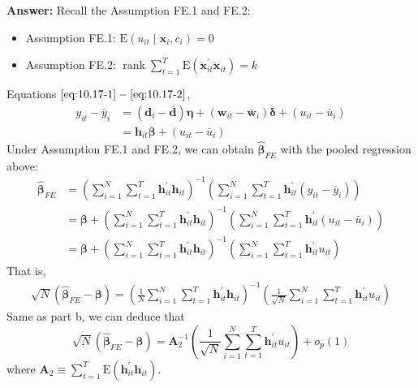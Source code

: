 \begin{enumerate}
\begin{enumerate}
        \textbf{Answer:} Recall the Assumption FE.1 and FE.2:
        \begin{itemize}
            \item Assumption FE.1: $\mathrm{E}(u_{it} \mid \mathbf{x}_i,c_i) = 0$
            \item Assumption FE.2: $\operatorname{rank} \sum_{t=1}^T \mathrm{E} \left( \ddot{\mathbf{x}}_{it}^\prime \ddot{\mathbf{x}}_{it} \right) = k$
        \end{itemize}
        Equations $\eqref{eq:10.17-1}-\eqref{eq:10.17-2}$,
        \begin{align*}
            y_{it} - \bar{y}_i &= (\mathbf{d}_t - \bar{\mathbf{d}})\bm{\eta} + (\mathbf{w}_{it} - \bar{\mathbf{w}}_i)\bm{\delta} + (u_{it} - \bar{u}_i) \\
            &= \mathbf{h}_{it}\bm{\beta} + (u_{it} - \bar{u}_i)
        \end{align*}
        Under Assumption FE.1 and FE.2, we can obtain $\hat{\bm{\beta}}_{FE}$ with the pooled regression above:
        \begin{align*}
            \hat{\bm{\beta}}_{FE} &= \left( \sum_{i=1}^N \sum_{t=1}^T \mathbf{h}_{it}^\prime \mathbf{h}_{it} \right)^{-1} \left( \sum_{i=1}^N \sum_{t=1}^T \mathbf{h}_{it}^\prime (y_{it} - \bar{y}_i) \right) \\
            &= \bm{\beta} + \left( \sum_{i=1}^N \sum_{t=1}^T \mathbf{h}_{it}^\prime \mathbf{h}_{it} \right)^{-1} \left( \sum_{i=1}^N \sum_{t=1}^T \mathbf{h}_{it}^\prime (u_{it}- \bar{u}_{i}) \right) \\
            &= \bm{\beta} + \left( \sum_{i=1}^N \sum_{t=1}^T \mathbf{h}_{it}^\prime \mathbf{h}_{it} \right)^{-1} \left( \sum_{i=1}^N \sum_{t=1}^T \mathbf{h}_{it}^\prime u_{it} \right)
        \end{align*}
        That is,
        \begin{gather*}
            \sqrt{N}\left( \hat{\bm{\beta}}_{FE} - \bm{\beta} \right) = \left( \frac{1}{N} \sum_{i=1}^N \sum_{t=1}^T \mathbf{h}_{it}^\prime \mathbf{h}_{it} \right)^{-1} \left( \frac{1}{\sqrt{N}}\sum_{i=1}^N \sum_{t=1}^T \mathbf{h}_{it}^\prime u_{i t} \right) 
        \end{gather*}
        Same as part b, we can deduce that 
        \[ \sqrt{N}\left( \hat{\bm{\beta}}_{FE} - \bm{\beta} \right) = \mathbf{A}_2^{-1} \left( \frac{1}{\sqrt{N}}\sum_{i=1}^N \sum_{t=1}^T \mathbf{h}_{it}^\prime u_{it} \right) + o_p(1) \]
        where $\displaystyle\mathbf{A}_{2} \equiv \sum_{t=1}^{T} \mathrm{E}\left(\mathbf{h}_{i t}^{\prime} \mathbf{h}_{i t}\right)$.
        

\end{enumerate}
\end{enumerate}
